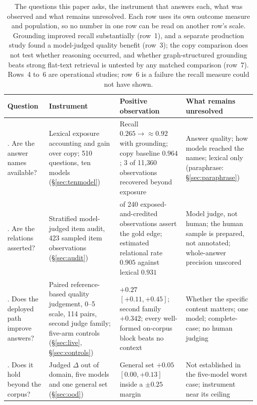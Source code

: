 \documentclass[10pt,twocolumn]{article}
\begin{document}
\begin{table}[t]\centering\small
\caption{The questions this paper asks, the instrument that answers each, what was observed and
what remains unresolved. Each row uses its own outcome measure and population, so no number in one
row can be read on another row's scale. Grounding improved recall substantially (row~1), and a
separate production study found a model-judged quality benefit (row~3); the copy comparison does not
test whether reasoning occurred, and whether graph-structured grounding beats strong flat-text
retrieval is untested by any matched comparison (row~7). Rows~4 to~6 are operational studies; row~6
is a failure the recall measure could not have shown.}
\label{tab:instruments}
\renewcommand{\arraystretch}{1.15}
\begin{tabularx}{\textwidth}{@{}>{\raggedright\arraybackslash}p{2.9cm} >{\raggedright\arraybackslash}p{3.6cm} >{\raggedright\arraybackslash}X >{\raggedright\arraybackslash}p{4.3cm}@{}}
\toprule
Question & Instrument & Positive observation & What remains unresolved \\
\midrule
1. Are the answer names available? & Lexical exposure accounting and gain over copy; 510 questions, ten models (\S\ref{sec:tenmodel}) & Recall $0.265\to{\approx}0.92$ with grounding; copy baseline $0.964$; 3 of 11{,}360 observations recovered beyond exposure & Answer quality; how models reached the names; lexical only (paraphrase: \S\ref{sec:paraphrase}) \\
2. Are the relations asserted? & Stratified model-judged item audit, 423 sampled item observations (\S\ref{sec:audit}) & 233 of 240 exposed-and-credited observations assert the gold edge; estimated relational rate $0.905$ against lexical $0.931$ & Model judge, not human; the human sample is prepared, not annotated; whole-answer precision unscored \\
3. Does the deployed path improve answers? & Paired reference-based quality judgement, 0--5 scale, 114 pairs, second judge family; five-arm controls (\S\ref{sec:live}, \S\ref{sec:controls}) & $+0.27$ $[+0.11,+0.45]$; second family $+0.342$; every well-formed on-corpus block beats no context & Whether the specific content matters; one model; complete-case; no human judging \\
4. Does it hold beyond the corpus? & Judged $\Delta$ out of domain, five models and one general set (\S\ref{sec:ood}) & General set $+0.05$ $[0.00,+0.13]$ inside a $\pm0.25$ margin & Not established in the five-model worst case; instrument near its ceiling \\

\end{tabularx}
\end{table}
\end{document}
